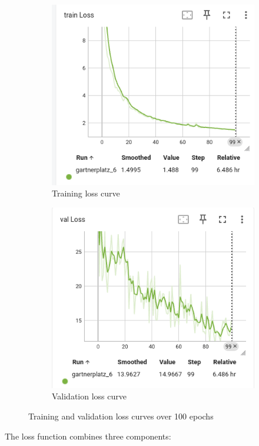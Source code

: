 \begin{figure}[h]
    \centering
    \begin{subfigure}{0.48\textwidth}
        \centering
        \includegraphics[width=\textwidth]{figures/train.png}
        \caption{Training loss curve}
        \label{fig:train_curve}
    \end{subfigure}
    \hfill
    \begin{subfigure}{0.48\textwidth}
        \centering
        \includegraphics[width=\textwidth]{figures/validation.png}
        \caption{Validation loss curve}
        \label{fig:val_curve}
    \end{subfigure}
    \caption{Training and validation loss curves over 100 epochs}
    \label{fig:training_curves}

\end{figure}
The loss function combines three components:


